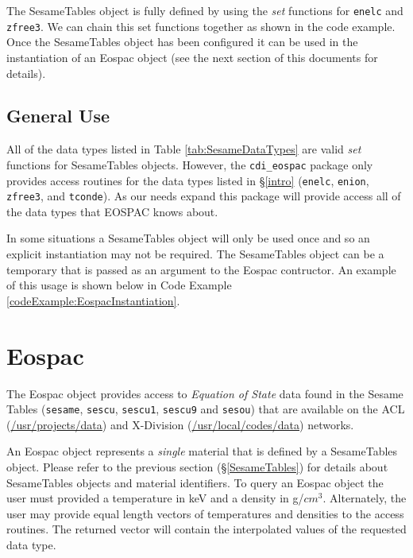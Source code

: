 \documentclass[11pt]{nmemo}
\begin{document}
The SesameTables object is fully defined by using the \emph{set}
functions for \texttt{enelc} and \texttt{zfree3}.  We can chain this
set functions together as shown in the code example.  Once the
SesameTables object has been configured it can be used in the
instantiation of an Eospac object (see the next section of this
documents for details).


\subsection{General Use}

All of the data types listed in Table \ref{tab:SesameDataTypes} are
valid \emph{set} functions for SesameTables objects.  However, the
\texttt{cdi\_eospac} package only provides access routines for the
data types listed in \S\ref{intro} (\texttt{enelc}, \texttt{enion},
\texttt{zfree3}, and \texttt{tconde}).  As our needs expand this
package will provide access all of the data types that EOSPAC knows
about.

In some situations a SesameTables object will only be used once and so 
an explicit instantiation may not be required.  The SesameTables
object can be a temporary that is passed as an argument to the Eospac
contructor.  An example of this usage is shown below in Code Example
\ref{codeExample:EospacInstantiation}. 




\section{Eospac}

The Eospac object provides access to \emph{Equation of State} data
found in the Sesame Tables (\texttt{sesame}, \texttt{sescu},
\texttt{sescu1}, \texttt{sescu9} and \texttt{sesou}) that are
available on the ACL (\url{/usr/projects/data}) and X-Division
(\url{/usr/local/codes/data}) networks.  

An Eospac object represents a \emph{single} material that is defined
by a SesameTables object.  Please refer to the previous section
(\S\ref{SesameTables}) for details about SesameTables objects and
material identifiers.  To query an Eospac object the user must
provided a temperature in keV and a density in g/$cm^3$.  Alternately,
the user may provide equal length vectors of temperatures and
densities to the access routines.  The returned vector will contain
the interpolated values of the requested data type.
\end{document}
